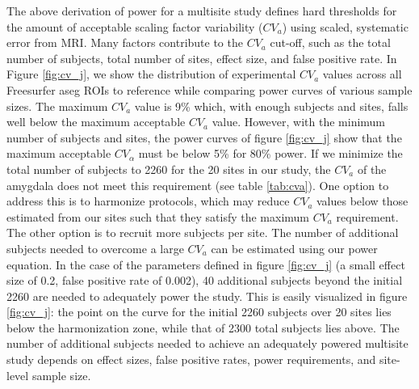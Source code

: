 The above derivation of power for a multisite study defines hard thresholds for the amount of acceptable scaling factor variability ($CV_{a}$) using scaled, systematic error from MRI. Many factors contribute to the $CV_{a}$ cut-off, such as the total number of subjects, total number of sites, effect size, and false positive rate. In Figure \ref{fig:cv_j}, we show the distribution of experimental $CV_{a}$ values across all Freesurfer aseg ROIs to reference while comparing power curves of various sample sizes. The maximum $CV_{a}$ value is 9\% which, with enough subjects and sites, falls well below the maximum acceptable $CV_{a}$ value. However, with the minimum number of subjects and sites, the power curves of figure \ref{fig:cv_j} show that the maximum acceptable $CV_{\alpha}$ must be below 5\% for 80\% power. If we minimize the total number of subjects to 2260 for the 20 sites in our study, the $CV_{a}$ of the amygdala does not meet this requirement (see table \ref{tab:cva}). One option to address this is to harmonize protocols, which may reduce $CV_a$ values below those estimated from our sites such that they satisfy the maximum $CV_{a}$ requirement. The other option is to recruit more subjects per site. The number of additional subjects needed to overcome a large $CV_a$ can be estimated using our power equation. In the case of the parameters defined in figure \ref{fig:cv_j} (a small effect size of 0.2, false positive rate of 0.002), 40 additional subjects beyond the initial 2260 are needed to adequately power the study. This is easily visualized in figure \ref{fig:cv_j}: the point on the curve for the initial 2260 subjects over 20 sites lies below the harmonization zone, while that of 2300 total subjects lies above. The number of additional subjects needed to achieve an adequately powered multisite study depends on effect sizes, false positive rates, power requirements, and site-level sample size. 

